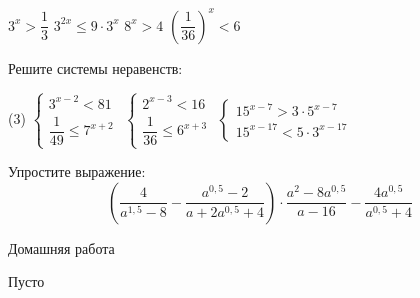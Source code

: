 \begin{class}[number=3]
\begin{listofex}
\begin{tasks}
			\task \( 3^x > \dfrac{1}{3} \)
			\task \( 3^{2x} \le 9 \cdot 3^x \)
			\task \( 8^x>4 \)
			\task \( \left( \dfrac{1}{36} \right)^x < 6 \)
		\end{tasks}
		\item Решите системы неравенств:
		\begin{tasks}(3)
			\task \( \begin{cases} 3^{x-2}<81 \\ \dfrac{1}{49} \le 7^{x+2} \end{cases} \)
			\task \( \begin{cases} 2^{x-3}<16 \\ \dfrac{1}{36} \le 6^{x+3} \end{cases} \)
			\task \( \begin{cases} 15^{x-7}>3 \cdot 5^{x-7} \\ 15^{x-17}<5 \cdot 3^{x-17} \end{cases} \)
		\end{tasks}
		\item Упростите выражение: \[ \left( \dfrac{4}{a^{1,5}-8} - \dfrac{a^{0,5}-2}{a+2a^{0,5}+4} \right) \cdot \dfrac{a^2-8a^{0,5}}{a-16} - \dfrac{4a^{0,5}}{a^{0,5}+4} \]
	\end{listofex}
\end{class}

\begin{homework}[number=3]
	\begin{listofex}
		\item Домашняя работа
	\end{listofex}
\end{homework}

\begin{class}[number=4]
	\begin{listofex}
		\item Пусто
	\end{listofex}
\end{class}
